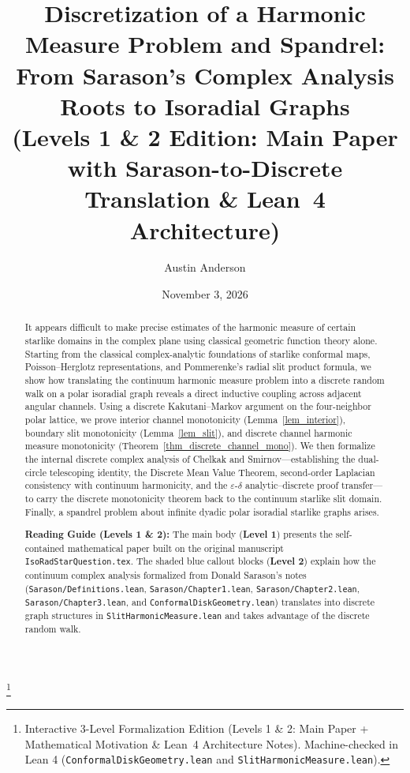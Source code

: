 \documentclass[11pt,reqno]{amsart}
\numberwithin{equation}{section}
\newcommand{\eps}{\varepsilon}
\begin{document}
\sloppy

\title[Discretization of a Harmonic Measure Problem and Spandrel]
{Discretization of a Harmonic Measure Problem and Spandrel:\\
From Sarason's Complex Analysis Roots to Isoradial Graphs\\
{\small (Levels 1 \& 2 Edition: Main Paper with Sarason-to-Discrete Translation \& Lean~4 Architecture)}}
\date{November 3, 2026}

\author[A. Anderson]{Austin Anderson}

\thanks{Interactive 3-Level Formalization Edition (Levels 1 \& 2: Main Paper + Mathematical Motivation \& Lean~4 Architecture Notes). Machine-checked in Lean 4 (\texttt{ConformalDiskGeometry.lean} and \texttt{SlitHarmonicMeasure.lean}).}

\begin{abstract}
It appears difficult to make precise estimates of the harmonic measure of certain starlike domains in the complex plane using classical geometric function theory alone. Starting from the classical complex-analytic foundations of starlike conformal maps, Poisson--Herglotz representations, and Pommerenke's radial slit product formula, we show how translating the continuum harmonic measure problem into a discrete random walk on a polar isoradial graph reveals a direct inductive coupling across adjacent angular channels. Using a discrete Kakutani--Markov argument on the four-neighbor polar lattice, we prove interior channel monotonicity (Lemma~\ref{lem_interior}), boundary slit monotonicity (Lemma~\ref{lem_slit}), and discrete channel harmonic measure monotonicity (Theorem~\ref{thm_discrete_channel_mono}). We then formalize the internal discrete complex analysis of Chelkak and Smirnov---establishing the dual-circle telescoping identity, the Discrete Mean Value Theorem, second-order Laplacian consistency with continuum harmonicity, and the $\eps$-$\delta$ analytic--discrete proof transfer---to carry the discrete monotonicity theorem back to the continuum starlike slit domain. Finally, a spandrel problem about infinite dyadic polar isoradial starlike graphs arises.

\medskip
\noindent\textbf{Reading Guide (Levels 1 \& 2):} The main body (\textbf{Level 1}) presents the self-contained mathematical paper built on the original manuscript \texttt{IsoRadStarQuestion.tex}. The shaded blue callout blocks (\textbf{Level 2}) explain how the continuum complex analysis formalized from Donald Sarason's notes (\texttt{Sarason/Definitions.lean}, \texttt{Sarason/Chapter1.lean}, \texttt{Sarason/Chapter2.lean}, \texttt{Sarason/Chapter3.lean}, and \texttt{ConformalDiskGeometry.lean}) translates into discrete graph structures in \texttt{SlitHarmonicMeasure.lean} and takes advantage of the discrete random walk.
\end{abstract}
\end{document}

